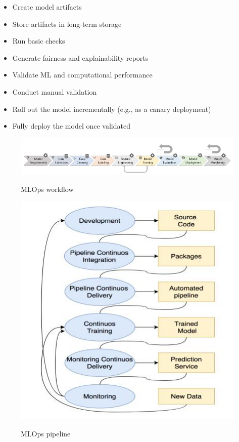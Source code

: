 \begin{itemize}
    \item Create model artifacts
    \item Store artifacts in long-term storage
    \item Run basic checks
    \item Generate fairness and explainability reports
\end{itemize}
\begin{itemize}
    \item Validate ML and computational performance
    \item Conduct manual validation
\end{itemize}
\begin{itemize}
    \item Roll out the model incrementally (e.g., as a canary deployment)
    \item Fully deploy the model once validated
\end{itemize}

\begin{figure}[!htbp]
    \caption{MLOps workflow\cite{8804457}}
    \centering
    \includegraphics[scale=0.6]{images/mlops-workflow-9-stages}
    \label{fig:mlops-workflow}
\end{figure}

\begin{figure}[!htbp]
    \caption{MLOps pipeline\cite{inproceedings}}
    \centering
    \includegraphics[scale=0.5]{images/mlops-pipeline}
    \label{fig:mlops-pipeline}
\end{figure}

